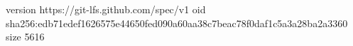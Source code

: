 version https://git-lfs.github.com/spec/v1
oid sha256:edb71edef1626575e44650fed090a60aa38c7beac78f0daf1c5a3a28ba2a3360
size 5616
